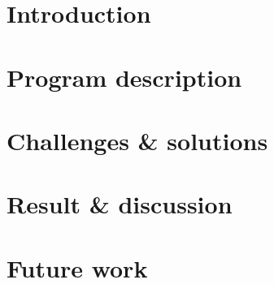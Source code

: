 \documentclass[a4paper,10pt]{article}
\begin{document}

\tableofcontents


\section{Introduction}
\label{sec:introduction}


\section{Program description}
\label{sec:description}


\section{Challenges \& solutions}
\label{sec:challenges}


\section{Result \& discussion}
\label{sec:results}


\section{Future work}
\label{sec:future-work}

\end{document}
